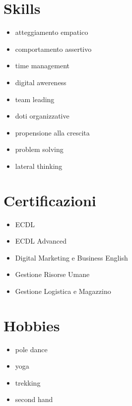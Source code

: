\documentclass[pastel-red]{new-hipster}
\begin{document}
\begin{bgbox}[height=\paperheight-\headerheight,width=\leftcolwidth,colback=cvsidebar]
  \section{Skills}
  \footnotesize
  \begin{itemize}
  \item atteggiamento empatico
  \item comportamento assertivo
  \item time management
  \item digital awereness
  \item team leading
  \item doti organizzative
  \item propensione alla crescita
  \item problem solving
  \item lateral thinking
  \end{itemize}

  \section{Certificazioni}
  \footnotesize
  \begin{itemize}
  \item ECDL
  \item ECDL Advanced
  \item Digital Marketing e Business English
  \item Gestione Risorse Umane
  \item Gestione Logistica e Magazzino
  \end{itemize}

  \section{Hobbies}
  \footnotesize
  \begin{itemize}
  \item pole dance
  \item yoga
  \item trekking
  \item second hand
  \end{itemize}
\end{bgbox}
\end{document}
